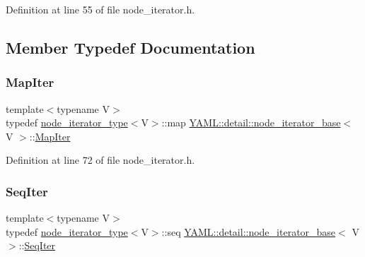 Definition at line 55 of file node\+\_\+iterator.\+h.



\subsection{Member Typedef Documentation}
\mbox{\label{class_y_a_m_l_1_1detail_1_1node__iterator__base_aaa2316d6fa0080ad766fc2429f7a68ed}} 
\subsubsection{\texorpdfstring{MapIter}{MapIter}}
{\footnotesize\ttfamily template$<$typename V$>$ \\
typedef \mbox{\hyperlink{struct_y_a_m_l_1_1detail_1_1node__iterator__type}{node\+\_\+iterator\+\_\+type}}$<$V$>$\+::map \mbox{\hyperlink{class_y_a_m_l_1_1detail_1_1node__iterator__base}{Y\+A\+M\+L\+::detail\+::node\+\_\+iterator\+\_\+base}}$<$ V $>$\+::\mbox{\hyperlink{class_y_a_m_l_1_1detail_1_1node__iterator__base_aaa2316d6fa0080ad766fc2429f7a68ed}{Map\+Iter}}}



Definition at line 72 of file node\+\_\+iterator.\+h.

\mbox{\label{class_y_a_m_l_1_1detail_1_1node__iterator__base_a8f7819d74588685905ebe83938c2a89b}} 
\subsubsection{\texorpdfstring{SeqIter}{SeqIter}}
{\footnotesize\ttfamily template$<$typename V$>$ \\
typedef \mbox{\hyperlink{struct_y_a_m_l_1_1detail_1_1node__iterator__type}{node\+\_\+iterator\+\_\+type}}$<$V$>$\+::seq \mbox{\hyperlink{class_y_a_m_l_1_1detail_1_1node__iterator__base}{Y\+A\+M\+L\+::detail\+::node\+\_\+iterator\+\_\+base}}$<$ V $>$\+::\mbox{\hyperlink{class_y_a_m_l_1_1detail_1_1node__iterator__base_a8f7819d74588685905ebe83938c2a89b}{Seq\+Iter}}}



